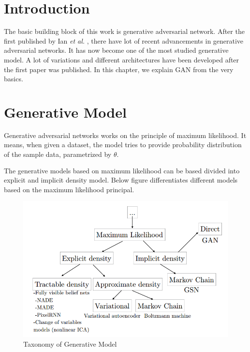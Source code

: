 

\section{Introduction}

The basic building block of this work is generative adversarial network. After the first published by Ian \textit{et al.} \cite{Original-GAN} , there have lot of recent advancements in generative adversarial networks. It has now become one of the most studied generative model. A lot of variations and different architectures have been developed after the first paper was published. In this chapter, we explain GAN from the very basics.

\section{Generative Model}
Generative adversarial networks works on the principle of maximum likelihood.
It means, when given a dataset, the model tries to provide probability distribution of the sample data, parametrized by $\theta$. %
\par
The generative models based on maximum likelihood can be based divided into explicit and implicit density model. Below figure differentiates different models based on the maximum likelihood principal.
%
\begin{figure}[ht]
    
    \includegraphics[scale=.6, angle=0]{Files/taxanomy.png}
    \caption[The panther]{Taxonomy of Generative Model\cite{GanTut}}
    \label{fig: jordan}
\end{figure}

